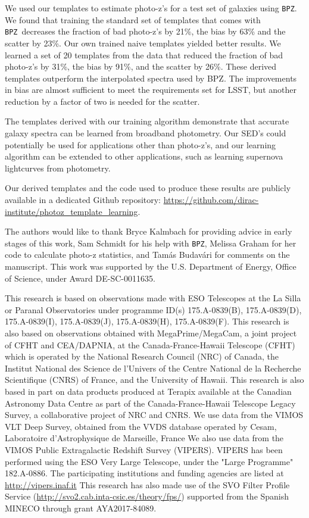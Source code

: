 \documentclass[twocolumn]{aastex63}
\newcommand{\pzcode}[1]{\texttt{#1}}
\newcommand{\bpz}{\pzcode{BPZ}}
\begin{document}
    We used our templates to estimate photo-z's for a test set of galaxies using \bpz.
    We found that training the standard set of templates that comes with \bpz\ decreases the fraction of bad photo-z's by 21\%, the bias by 63\% and the scatter by 23\%.
    Our own trained naive templates yielded better results.
    We learned a set of 20 templates from the data that reduced the fraction of bad photo-z's by 31\%, the bias by 91\%, and the scatter by 26\%.
    These derived templates outperform the interpolated spectra used by BPZ.
    The improvements in bias are almost sufficient to meet the requirements set for LSST, but another reduction by a factor of two is needed for the scatter.

    The templates derived with our training algorithm demonstrate that accurate galaxy spectra can be learned from broadband photometry.
    Our SED's could potentially be used for applications other than photo-z's, and our learning algorithm can be extended to other applications, such as learning supernova lightcurves from photometry.

    Our derived templates and the code used to produce these results are publicly available in a dedicated Github repository: \url{https://github.com/dirac-institute/photoz_template_learning}.

\acknowledgments

The authors would like to thank Bryce Kalmbach for providing advice in early stages of this work, Sam Schmidt for his help with \bpz, Melissa Graham for her code to calculate photo-z statistics, and Tam\'as Budav\'ari for comments on the manuscript. This work was supported by the U.S. Department of Energy, Office of Science, under Award DE-SC-0011635.

This research is based on observations made with ESO Telescopes at the La Silla or Paranal Observatories under programme ID(s) 175.A-0839(B), 175.A-0839(D), 175.A-0839(I), 175.A-0839(J), 175.A-0839(H), 175.A-0839(F).
This research is also based on observations obtained with MegaPrime/MegaCam, a joint project of CFHT and CEA/DAPNIA, at the Canada-France-Hawaii Telescope (CFHT) which is operated by the National Research Council (NRC) of Canada, the Institut National des Science de l'Univers of the Centre National de la Recherche Scientifique (CNRS) of France, and the University of Hawaii.
This research is also based in part on data products produced at Terapix available at the Canadian Astronomy Data Centre as part of the Canada-France-Hawaii Telescope Legacy Survey, a collaborative project of NRC and CNRS.
We use data from the VIMOS VLT Deep Survey, obtained from the VVDS database operated by Cesam, Laboratoire d'Astrophysique de Marseille, France
We also use data from the VIMOS Public Extragalactic Redshift Survey (VIPERS).
VIPERS has been performed using the ESO Very Large Telescope, under the "Large Programme" 182.A-0886. 
The participating institutions and funding agencies are listed at \url{http://vipers.inaf.it}
This research has also made use of the SVO Filter Profile Service (\url{http://svo2.cab.inta-csic.es/theory/fps/}) supported from the Spanish MINECO through grant AYA2017-84089.
\end{document}
